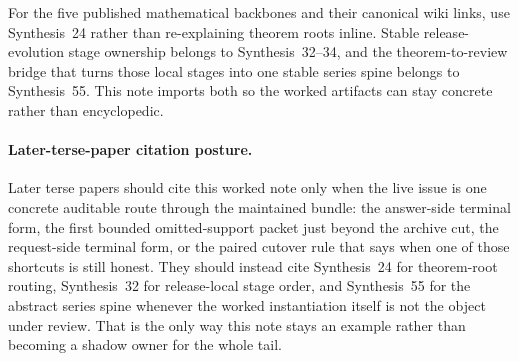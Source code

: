 \documentclass[11pt]{article}
\begin{document}
For the five published mathematical backbones and their canonical wiki links, use Synthesis~24 rather than re-explaining theorem roots inline. Stable release-evolution stage ownership belongs to Synthesis~32--34, and the theorem-to-review bridge that turns those local stages into one stable series spine belongs to Synthesis~55. This note imports both so the worked artifacts can stay concrete rather than encyclopedic.\cite{series:mathcrosswalk,series:releasespine,series:releaseclosure,series:statusenvelopes,series:seriesspines}

\paragraph{Later-terse-paper citation posture.}
Later terse papers should cite this worked note only when the live issue is one concrete auditable route through the maintained bundle: the answer-side terminal form, the first bounded omitted-support packet just beyond the archive cut, the request-side terminal form, or the paired cutover rule that says when one of those shortcuts is still honest. They should instead cite Synthesis~24 for theorem-root routing, Synthesis~32 for release-local stage order, and Synthesis~55 for the abstract series spine whenever the worked instantiation itself is not the object under review. That is the only way this note stays an example rather than becoming a shadow owner for the whole tail.\cite{series:mathcrosswalk,series:releasespine,series:seriesspines,series:pairedterminalcitationdiscipline,series:pairedterminalcutoverrules}
\end{document}
